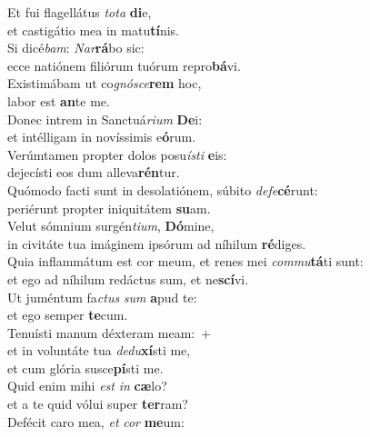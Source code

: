 \evenverse Et fui flagellátus \textit{to}\textit{ta} \textbf{di}e,~\*\\
\evenverse et castigátio mea in matu\textbf{tí}nis.\\
\oddverse Si dicé\textit{bam}: \textit{Nar}\textbf{rá}bo sic:~\*\\
\oddverse ecce natiónem filiórum tuórum repro\textbf{bá}vi.\\
\evenverse Existimábam ut co\textit{gnó}\textit{sce}\textbf{rem} hoc,~\*\\
\evenverse labor est \textbf{an}te me.\\
\oddverse Donec intrem in Sanctuá\textit{ri}\textit{um} \textbf{De}i:~\*\\
\oddverse et intélligam in novíssimis e\textbf{ó}rum.\\
\evenverse Verúmtamen propter dolos posu\textit{í}\textit{sti} \textbf{e}is:~\*\\
\evenverse dejecísti eos dum alleva\textbf{rén}tur.\\
\oddverse Quómodo facti sunt in desolatiónem, súbito \textit{de}\textit{fe}\textbf{cé}runt:~\*\\
\oddverse periérunt propter iniquitátem \textbf{su}am.\\
\evenverse Velut sómnium surgén\textit{ti}\textit{um}, \textbf{Dó}mine,~\*\\
\evenverse in civitáte tua imáginem ipsórum ad níhilum \textbf{ré}diges.\\
\oddverse Quia inflammátum est cor meum, et renes mei \textit{com}\textit{mu}\textbf{tá}ti sunt:~\*\\
\oddverse et ego ad níhilum redáctus sum, et ne\textbf{scí}vi.\\
\evenverse Ut juméntum fa\textit{ctus} \textit{sum} \textbf{a}pud te:~\*\\
\evenverse et ego semper \textbf{te}cum.\\
\oddverse Tenuísti manum déxteram meam:~+\\
\oddverse  et in voluntáte tua \textit{de}\textit{du}\textbf{xí}sti me,~\*\\
\oddverse et cum glória susce\textbf{pí}sti me.\\
\evenverse Quid enim mihi \textit{est} \textit{in} \textbf{cæ}lo?~\*\\
\evenverse et a te quid vólui super \textbf{ter}ram?\\
\oddverse Defécit caro mea, \textit{et} \textit{cor} \textbf{me}um:~\*\\

